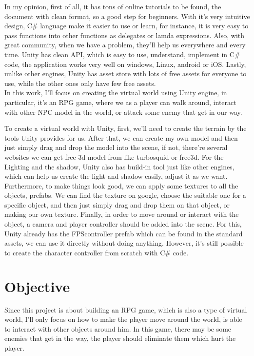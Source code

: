 \documentclass[a4paper, 13pt]{extarticle}
\begin{document}
 In my opinion, first of all, it has tons of online tutorials to be found, the document with clean format, so a good step for beginners. With it's very intuitive design, C\# language make it easier to use or learn, for instance, it is very easy to pass functions into other functions as delegates or lamda expressions. Also, with great community, when we have a problem, they'll help us everywhere and every time. Unity has clean API, which is easy to use, understand, implement in C\# code, the application works very well on windows, Linux, android or iOS. Lastly, unlike other engines, Unity has asset store with lots of free assets for everyone to use, while the other ones only have few free assets. \\[0.35cm]In this work, I'll focus on creating the virtual world using Unity engine, in particular, it's an RPG game, where we as a player can walk around, interact with other NPC model in the world, or attack some enemy that get in our way. 
  

 To create a virtual world with Unity, first, we'll need to create the terrain by the tools Unity provides for us. After that, we can create my own model and then just simply drag and drop the model into the scene, if not, there're several websites we can get free 3d model from like turbosquid or free3d. For the Lighting and the shadow, Unity also has build-in tool just like other engines, which can help us create the light and shadow easily, adjust it as we want. Furthermore, to make things look good, we can apply some textures to all the objects, prefabs. We can find the texture on google, choose the suitable one for a specific object, and then just simply drag and drop them on that object, or making our own texture. Finally, in order to move around or interact with the object, a camera and player controller should be added into the scene. For this, Unity already has the FPScontroller prefab which can be found in the standard assets, we can use it directly without doing anything. However, it's still possible to create the character controller from scratch with C\# code.
 \section{\Large Objective} 
 	Since this project is about building an RPG game, which is also a type of virtual world, I'll only focus on how to make the player move around the world, is able to interact with other objects around him. In this game, there may be some enemies that get in the way, the player should eliminate them which hurt the player. 
\end{document}
